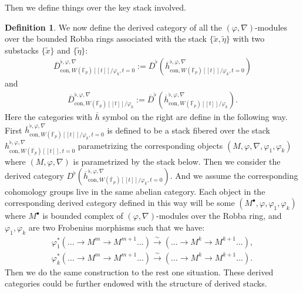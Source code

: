 \documentclass[11pt]{book}
\theoremstyle{definition}
\newtheorem{definition}[theorem]{Definition}
\numberwithin{equation}{section}
\begin{document}
\indent Then we define things over the key stack involved.

\begin{definition}
We now define the derived category of all the $(\varphi,\nabla)$-modules over the bounded Robba rings associated with the stack $\{\widetilde{x},\widetilde{\eta}\}$ with two substacks $\{\widetilde{x}\}$ and $\{\widetilde{\eta}\}$:
\begin{align}
\overline{D}^{\flat,\varphi,\nabla}_{\mathrm{con},W(\overline{\mathbb{F}}_p)[[t]]/\varphi_k,t=0}:=\overline{D}^\flat(\overline{h}^{\flat,\varphi,\nabla}_{\mathrm{con},W(\overline{\mathbb{F}}_p)[[t]]/\varphi_k,t=0})	
\end{align}
and 
\begin{align}
\overline{D}^{\flat,\varphi,\nabla}_{\mathrm{con},W(\overline{\mathbb{F}}_p)[[t]]/\varphi_k}:=\overline{D}^\flat(\overline{h}^{\flat,\varphi,\nabla}_{\mathrm{con},W(\overline{\mathbb{F}}_p)[[t]]/\varphi_k}).
\end{align}
Here the categories with $\overline{h}$ symbol on the right are define in the following way. First $\overline{h}^{\flat,\varphi,\nabla}_{\mathrm{con},W(\overline{\mathbb{F}}_p)[[t]]/\varphi_k,t=0}$ is defined to be a stack fibered over the stack $h^{\flat,\varphi,\nabla}_{\mathrm{con},W(\overline{\mathbb{F}}_p)[[t]],t=0}$ parametrizing the corresponding objects $(M,\varphi,\nabla,\varphi_{1},\varphi_k)$ where $(M,\varphi,\nabla)$ is parametrized by the stack below. Then we consider the derived category $D^\flat(\overline{h}^{\flat,\varphi,\nabla}_{\mathrm{con},W(\overline{\mathbb{F}}_p)[[t]]/\varphi_k,t=0})$. And we assume the corresponding cohomology groups live in the same abelian category. Each object in the corresponding derived category defined in this way will be some $(M^\bullet,\varphi,\varphi_{1},\varphi_k)$ where $M^\bullet$ is bounded complex of $(\varphi,\nabla)$-modules over the Robba ring, and $\varphi_{1},\varphi_k$ are two Frobenius morphisms such that we have:
\begin{align}
\varphi_1^*(...\rightarrow M^m \rightarrow M^{m+1}...)\overset{\sim}{\longrightarrow} (...\rightarrow M^k \rightarrow M^{k+1}...),\\
\varphi_k^*(...\rightarrow M^m \rightarrow M^{m+1}...)\overset{\sim}{\longrightarrow} (...\rightarrow M^k \rightarrow M^{k+1}...).	
\end{align}
Then we do the same construction to the rest one situation. These derived categories could be further endowed with the structure of derived stacks.
\end{definition}
\end{document}
